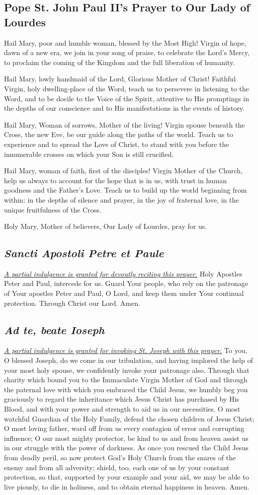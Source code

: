 \documentclass[12pt]{article}
\newcommand{\prayertitle}[1]{\subsection{#1}}
\newcommand{\indulgencedprayertitle}[1]{\prayertitle{#1 \protect\kreuz}}
\newcommand{\emphasis}[1]{\emph{#1}}
\newcommand{\emphasis}[1]{\textsl{#1}}
\newcommand{\foreign}[1]{\emphasis{#1}}
\newcommand{\note}[1]{{\small{\emphasis{#1}}}\newline}
\newcommand{\linkednote}[2]{\hyperlink{#1}{\note{#2}}}
\begin{document}
\prayertitle{Pope St. John Paul II's Prayer to Our Lady of Lourdes}
\label{prayer:JPII_Lady_of_Lourdes}
Hail Mary, poor and humble woman, blessed by the Most High!
Virgin of hope, dawn of a new era, we join in your song of praise, to celebrate the Lord's Mercy, to proclaim the coming of the Kingdom and the full liberation of humanity.

Hail Mary, lowly handmaid of the Lord, Glorious Mother of Christ!
Faithful Virgin, holy dwelling-place of the Word, teach us to persevere in listening to the Word, and to be docile to the Voice of the Spirit, attentive to His promptings in the depths of our conscience and to His manifestations in the events of history.

Hail Mary, Woman of sorrows, Mother of the living!
Virgin spouse beneath the Cross, the new Eve, be our guide along the paths of the world.
Teach us to experience and to spread the Love of Christ, to stand with you before the innumerable crosses on which your Son is still crucified.

Hail Mary, woman of faith, first of the disciples!
Virgin Mother of the Church, help us always to account for the hope that is in us, with trust in human goodness and the Father's Love.
Teach us to build up the world beginning from within:
in the depths of silence and prayer, in the joy of fraternal love, in the unique fruitfulness of the Cross.

Holy Mary, Mother of believers, Our Lady of Lourdes, pray for us.

\indulgencedprayertitle{\foreign{Sancti Apostoli Petre et Paule}}
\linkednote{grant20}{A partial indulgence is granted for devoutly reciting this prayer.}
Holy Apostles Peter and Paul, intercede for us.
Guard Your people, who rely on the patronage of Your apostles Peter and Paul, O Lord, and keep them under Your continual protection.
Through Christ our Lord. Amen.

\indulgencedprayertitle{\foreign{Ad te, beate Ioseph}}
\linkednote{grant19}{A partial indulgence is granted for invoking St. Joseph with this prayer.}
To you, O blessed Joseph, do we come in our tribulation, and having implored the help of your most holy spouse, we confidently invoke your patronage also.
Through that charity which bound you to the Immaculate Virgin Mother of God and through the paternal love with which you embraced the Child Jesus, we humbly beg you graciously to regard the inheritance which Jesus Christ has purchased by His Blood, and with your power and strength to aid us in our necessities.
O most watchful Guardian of the Holy Family, defend the chosen children of Jesus Christ;
O most loving father, ward off from us every contagion of error and corrupting influence;
O our most mighty protector, be kind to us and from heaven assist us in our struggle with the power of darkness.
As once you rescued the Child Jesus from deadly peril, so now protect God's Holy Church from the snares of the enemy and from all adversity;
shield, too, each one of us by your constant protection, so that, supported by your example and your aid, we may be able to live piously, to die in holiness, and to obtain eternal happiness in heaven.
Amen.
\end{document}
